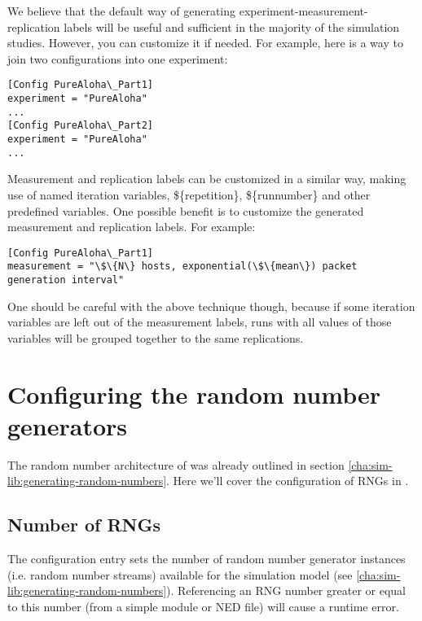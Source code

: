 We believe that the default way of generating
experiment-measurement-replication labels will be useful and
sufficient in the majority of the simulation studies. However, you can
customize it if needed. For example, here is a way to join two
configurations into one experiment:

\begin{Verbatim}[commandchars=\\\{\}]
[Config PureAloha\_Part1]
experiment = "PureAloha"
...
[Config PureAloha\_Part2]
experiment = "PureAloha"
...
\end{Verbatim}


Measurement and replication labels can be customized in a similar way,
making use of named iteration variables, \$\{repetition\},
\$\{runnumber\} and other predefined variables. One possible benefit is
to customize the generated measurement and replication labels. For
example:

\begin{Verbatim}[commandchars=\\\{\}]
[Config PureAloha\_Part1]
measurement = "\$\{N\} hosts, exponential(\$\{mean\}) packet generation interval"
\end{Verbatim}


One should be careful with the above technique though, because if some
iteration variables are left out of the measurement labels, runs with
all values of those variables will be grouped together to the same
replications.


\section{Configuring the random number generators}
\label{sec:ch-config-sim:rng-config}

The random number architecture of {\opp} was already outlined
in section \ref{cha:sim-lib:generating-random-numbers}. Here
we'll cover the configuration of RNGs in .

\subsection{Number of RNGs}

The  configuration entry sets the number of
random number generator instances (i.e. random number streams)
available for the simulation model (see \ref{cha:sim-lib:generating-random-numbers}).
Referencing an RNG number greater or equal to this number
(from a simple module or NED file) will cause a runtime error.


